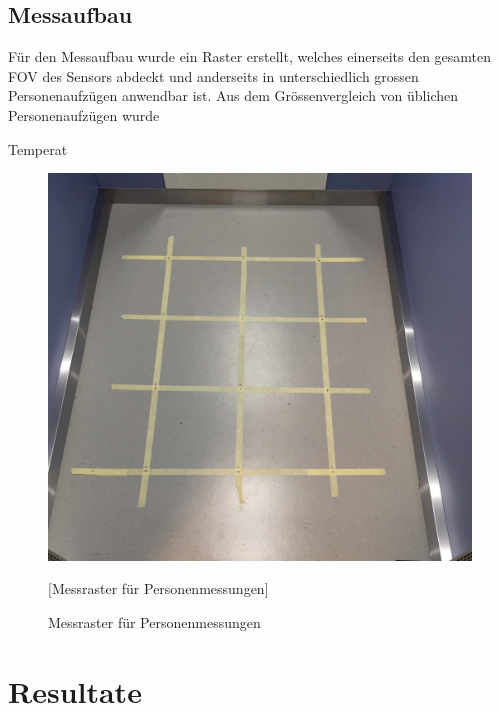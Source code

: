 \subsection{Messaufbau}

Für den Messaufbau wurde ein Raster erstellt, welches einerseits den gesamten \ac{FOV} des Sensors abdeckt und anderseits in unterschiedlich grossen Personenaufzügen anwendbar ist. Aus dem Grössenvergleich von üblichen Personenaufzügen wurde



Temperat


\begin{figure}[H]
	\centering
	\includegraphics[width=1.0\textwidth, angle=0]{fig/Messraster.JPG}
	\caption{Messraster für Personenmessungen}[Messraster für Personenmessungen]
	\label{fig:p1gallpositionsmean}
\end{figure}






\section{Resultate}

